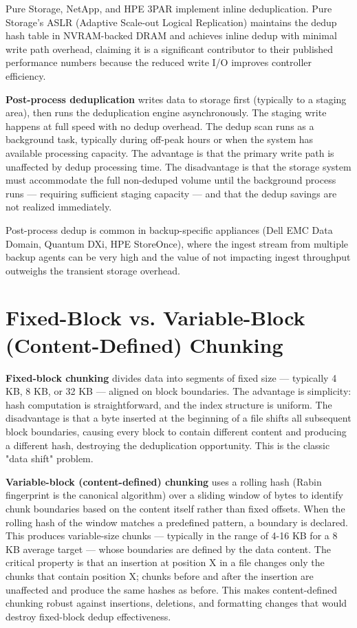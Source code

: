 Pure Storage, NetApp, and HPE 3PAR implement inline deduplication. Pure Storage's ASLR (Adaptive Scale-out Logical Replication) maintains the dedup hash table in NVRAM-backed DRAM and achieves inline dedup with minimal write path overhead, claiming it is a significant contributor to their published performance numbers because the reduced write I/O improves controller efficiency.

\textbf{Post-process deduplication} writes data to storage first (typically to a staging area), then runs the deduplication engine asynchronously. The staging write happens at full speed with no dedup overhead. The dedup scan runs as a background task, typically during off-peak hours or when the system has available processing capacity. The advantage is that the primary write path is unaffected by dedup processing time. The disadvantage is that the storage system must accommodate the full non-deduped volume until the background process runs --- requiring sufficient staging capacity --- and that the dedup savings are not realized immediately.

Post-process dedup is common in backup-specific appliances (Dell EMC Data Domain, Quantum DXi, HPE StoreOnce), where the ingest stream from multiple backup agents can be very high and the value of not impacting ingest throughput outweighs the transient storage overhead.

\section{Fixed-Block vs. Variable-Block (Content-Defined) Chunking}
\textbf{Fixed-block chunking} divides data into segments of fixed size --- typically 4 KB, 8 KB, or 32 KB --- aligned on block boundaries. The advantage is simplicity: hash computation is straightforward, and the index structure is uniform. The disadvantage is that a byte inserted at the beginning of a file shifts all subsequent block boundaries, causing every block to contain different content and producing a different hash, destroying the deduplication opportunity. This is the classic "data shift" problem.

\textbf{Variable-block (content-defined) chunking} uses a rolling hash (Rabin fingerprint is the canonical algorithm) over a sliding window of bytes to identify chunk boundaries based on the content itself rather than fixed offsets. When the rolling hash of the window matches a predefined pattern, a boundary is declared. This produces variable-size chunks --- typically in the range of 4-16 KB for a 8 KB average target --- whose boundaries are defined by the data content. The critical property is that an insertion at position X in a file changes only the chunks that contain position X; chunks before and after the insertion are unaffected and produce the same hashes as before. This makes content-defined chunking robust against insertions, deletions, and formatting changes that would destroy fixed-block dedup effectiveness.

